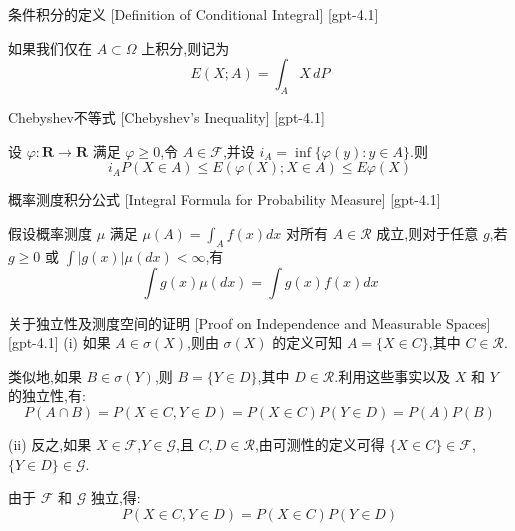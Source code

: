 \documentclass[UTF8]{ctexart}
\begin{document}
    
    
    \begin{dfn}
        {条件积分的定义}
        [Definition of Conditional Integral]
        [gpt-4.1]
        
如果我们仅在 $A \subset \Omega$ 上积分,则记为
\[
E(X; A) = \int_A X \, dP
\]

    \end{dfn}
    
    
    
    \begin{thm}
        {Chebyshev不等式}
        [Chebyshev's Inequality]
        [gpt-4.1]
        
设 $\varphi : \mathbf{R} \to \mathbf{R}$ 满足 $\varphi \geq 0$,令 $A \in \mathcal{F}$,并设 $i_A = \operatorname{inf}\{\varphi(y) : y \in A\}$.则
\[
i_A P(X \in A) \leq E(\varphi(X); X \in A) \leq E\varphi(X)
\]

    \end{thm}
    
    
    
    \begin{thm}
        {概率测度积分公式}
        [Integral Formula for Probability Measure]
        [gpt-4.1]
        
假设概率测度 $\mu$ 满足 $\mu(A) = \int_A f(x) dx$ 对所有 $A \in {\mathcal{R}}$ 成立,则对于任意 $g$,若 $g \geq 0$ 或 $\int |g(x)| \mu(dx) < \infty$,有
\[
\int g(x) \mu(dx) = \int g(x) f(x) dx
\]

    \end{thm}
    
    
    
    \begin{prf}
        {关于独立性及测度空间的证明}
        [Proof on Independence and Measurable Spaces]
        [gpt-4.1]
        (i) 如果 $A \in \sigma(X)$,则由 $\sigma(X)$ 的定义可知 $A = \{ X \in C \}$,其中 $C \in \mathcal{R}$.
    
类似地,如果 $B \in \sigma(Y)$,则 $B = \{ Y \in D \}$,其中 $D \in \mathcal{R}$.利用这些事实以及 $X$ 和 $Y$ 的独立性,有:
\[
P(A \cap B) = P(X \in C, Y \in D) = P(X \in C) P(Y \in D) = P(A) P(B)
\]

(ii) 反之,如果 $X \in \mathcal{F}$,$Y \in \mathcal{G}$,且 $C, D \in \mathcal{R}$,由可测性的定义可得 $\{ X \in C \} \in \mathcal{F}$,$\{ Y \in D \} \in \mathcal{G}$.

由于 $\mathcal{F}$ 和 $\mathcal{G}$ 独立,得:
\[
P(X \in C, Y \in D) = P(X \in C) P(Y \in D)
\]

    \end{prf}
    
\end{document}
